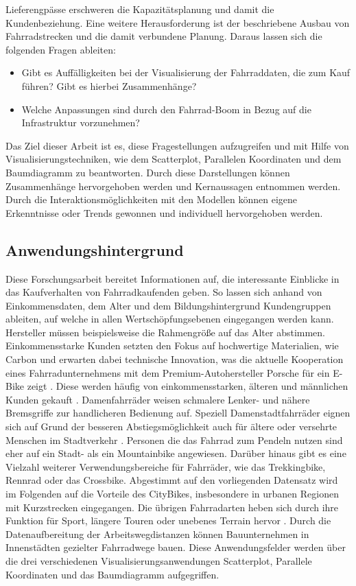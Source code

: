 \documentclass[usegeometry=true]{scrartcl}
\begin{document}
Lieferengpässe erschweren die Kapazitätsplanung und damit die Kundenbeziehung. Eine weitere Herausforderung ist der beschriebene Ausbau von Fahrradstrecken und die damit verbundene Planung. Daraus lassen sich die folgenden Fragen ableiten:
\begin{itemize}
\item Gibt es Auffälligkeiten bei der Visualisierung der Fahrraddaten, die zum Kauf führen? Gibt es hierbei Zusammenhänge?
\item Welche Anpassungen sind durch den Fahrrad-Boom in Bezug auf die Infrastruktur vorzunehmen?
\end{itemize}
Das Ziel dieser Arbeit ist es, diese Fragestellungen  aufzugreifen und mit Hilfe von Visualisierungstechniken, wie dem Scatterplot, Parallelen Koordinaten und dem Baumdiagramm zu beantworten. Durch diese Darstellungen können Zusammenhänge hervorgehoben werden und Kernaussagen entnommen werden. Durch die Interaktionsmöglichkeiten mit den Modellen können eigene Erkenntnisse oder Trends gewonnen und individuell hervorgehoben werden.    

\subsection{Anwendungshintergrund}


Diese Forschungsarbeit bereitet Informationen auf, die interessante Einblicke in das Kaufverhalten von Fahrradkaufenden geben. So lassen sich anhand von Einkommensdaten, dem Alter und dem Bildungshintergrund Kundengruppen ableiten, auf welche in allen Wertschöpfungsebenen eingegangen werden kann. Hersteller müssen beispielsweise die Rahmengröße auf das Alter abstimmen. Einkommensstarke Kunden setzten den Fokus auf hochwertige Materialien, wie Carbon und erwarten dabei technische Innovation, was die aktuelle Kooperation eines Fahrradunternehmens mit dem Premium-Autohersteller Porsche für ein E-Bike zeigt \cite{Nachrichten.31.08.2021}. Diese werden häufig von einkommensstarken, älteren und männlichen Kunden gekauft \cite{.07.09.2021,FahrradXXLBlog.14.12.2020}. Damenfahrräder weisen schmalere Lenker- und nähere Bremsgriffe zur handlicheren Bedienung auf. Speziell Damenstadtfahrräder eignen sich auf Grund der besseren Abstiegsmöglichkeit auch für ältere oder versehrte Menschen im Stadtverkehr \cite{Radfahren.08.02.2018}.
Personen die das Fahrrad zum Pendeln nutzen sind eher auf ein Stadt- als ein Mountainbike angewiesen.  Darüber hinaus gibt es eine Vielzahl weiterer  Verwendungsbereiche für Fahrräder, wie das Trekkingbike, Rennrad oder das Crossbike. Abgestimmt auf den vorliegenden Datensatz wird im Folgenden auf die Vorteile des CityBikes, insbesondere in urbanen Regionen mit Kurzstrecken eingegangen. Die übrigen Fahrradarten heben sich durch ihre Funktion für Sport, längere Touren oder unebenes Terrain hervor \cite{.04.09.2021}. 
Durch die Datenaufbereitung der Arbeitswegdistanzen können Bauunternehmen in Innenstädten gezielter Fahrradwege bauen. Diese Anwendungsfelder werden über die drei verschiedenen Visualisierungsanwendungen Scatterplot, Parallele Koordinaten und das Baumdiagramm aufgegriffen. 
 
\end{document}
